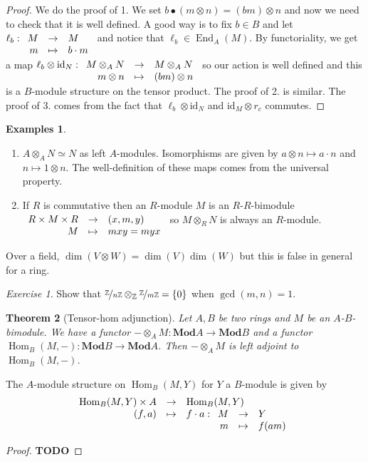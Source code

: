\documentclass{article}
\newcommand{\id}{\mathrm{id}}
\newcommand{\Z}{\mathbb{Z}}
\newcommand{\Mod}{\mathbf{Mod}}
\DeclareMathOperator{\Hom}{Hom}
\DeclareMathOperator{\End}{End}
\newcommand{\todo}{\textbf{TODO}}
\newcommand{\applic}[4]{\begin{array}[t]{rcl}
#1 & \to & #2 \\
#3 & \mapsto & #4
\end{array}}
\newcommand{\warning}{\faExclamationTriangle \hspace{3pt}}
\theoremstyle{plain}
\newtheorem{theorem}{Theorem}[section]
\theoremstyle{definition}
\newtheorem{examples}[theorem]{Examples}
\theoremstyle{remark}
\newtheorem*{exercise}{Exercise}
\begin{document}
\begin{proof}
    We do the proof of 1. We set $b \bullet (m \otimes n) = (bm) \otimes n$ and now we need to check that it is well defined. A good way is to fix $b \in B$ and let $\ell_b : \applic{M}{M}{m}{b\cdot m}$ and notice that $\ell_b \in \End_A(M)$. By functoriality, we get a map $\ell_b \otimes \id_N : \applic{M\otimes_A N}{M \otimes_A N}{m\otimes n}{(bm) \otimes n}$ so our action is well defined and this is a $B$-module structure on the tensor product. The proof of 2. is similar. The proof of 3. comes from the fact that $\ell_b \otimes \id_N$ and $\id_M \otimes r_c$ commutes.
\end{proof}

\begin{examples} \leavevmode
    \begin{enumerate}
        \item $A\otimes_A N \simeq N$ as left $A$-modules. Isomorphisms are given by $a \otimes n \mapsto a \cdot n$ and $n\mapsto 1\otimes n$. The well-definition of these maps comes from the universal property.
        \item If $R$ is commutative then an $R$-module $M$ is an $R$-$R$-bimodule $\applic{R\times M\times R}{(x,m,y)}{M}{mxy = myx}$ so $M\otimes_R N$ is always an $R$-module.
    \end{enumerate}
\end{examples}

\warning Over a field, $\dim(V \otimes W) = \dim(V)\dim(W)$ but this is false in general for a ring.

\begin{exercise}
    Show that $\nicefrac{\Z}{n\Z} \otimes_\Z \nicefrac{\Z}{m\Z} = \{0\}$ when $\gcd(m,n) = 1$.
\end{exercise}

\begin{theorem}[Tensor-hom adjunction]
    Let $A,B$ be two rings and $M$ be an $A$-$B$-bimodule. We have a functor $- \otimes_A M : \Mod A \to \Mod B$ and a functor $\Hom_B (M,-) : \Mod B \to \Mod A$. Then $-\otimes_A M$ is left adjoint to $\Hom_B (M,-)$.
\end{theorem}

The $A$-module structure on $\Hom_B (M,Y)$ for $Y$ a $B$-module is given by
\[\applic{\Hom_B(M,Y) \times A}{\Hom_B(M,Y)}{(f,a)}{f\cdot a : \applic{M}{Y}{m}{f(am)}}\]

\begin{proof}
    \todo
\end{proof}
\end{document}
